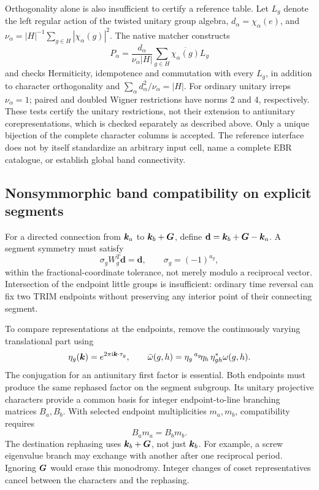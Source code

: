 Orthogonality alone is also insufficient to certify a reference
table. Let $L_g$ denote the left regular action of the twisted
unitary group algebra, $d_\alpha=\chi_\alpha(e)$, and
$\nu_\alpha=|H|^{-1}\sum_{g\in H}|\chi_\alpha(g)|^2$.
The native matcher constructs
\begin{equation}
 P_\alpha=\frac{d_\alpha}{\nu_\alpha|H|}
               \sum_{g\in H}\overline{\chi_\alpha(g)}L_g
 \label{eq:character-central-projector}
\end{equation}
and checks Hermiticity, idempotence and commutation with every $L_g$,
in addition to character orthogonality and
$\sum_\alpha d_\alpha^2/\nu_\alpha=|H|$.
For ordinary unitary irreps $\nu_\alpha=1$; paired and doubled Wigner
restrictions have norms 2 and 4, respectively. These tests certify
the unitary restrictions, not their extension to antiunitary
corepresentations, which is checked separately as described above.
Only a unique bijection of the complete character columns is accepted.
The reference interface does not by itself standardize an arbitrary
input cell, name a complete EBR catalogue, or establish global band
connectivity.

\subsection{Nonsymmorphic band compatibility on explicit segments}
For a directed connection from $\bm{k}_a$ to $\bm{k}_b+\bm{G}$, define
$\mathbf d=\bm{k}_b+\bm{G}-\bm{k}_a$. A segment symmetry must satisfy
\begin{equation}
 \sigma_g W_g^T\mathbf d=\mathbf d,\qquad
 \sigma_g=(-1)^{a_g},
 \label{eq:line-stabilizer}
\end{equation}
within the fractional-coordinate tolerance, not merely modulo a
reciprocal vector. Intersection of the endpoint little groups is
insufficient: ordinary time reversal can fix two TRIM endpoints
without preserving any interior point of their connecting segment.

To compare representations at the endpoints, remove the continuously
varying translational part using
\begin{equation}
 \eta_g(\bm{k})=e^{2\pi\mathrm{i}\bm{k}\cdot\tau_g},\qquad
 \bar\omega(g,h)=\eta_g\,{}^{a_g}\!\eta_h\,
                         \eta_{gh}^*\omega(g,h).
 \label{eq:line-rephasing}
\end{equation}
The conjugation for an antiunitary first factor is essential.
Both endpoints must produce the same rephased factor on the segment
subgroup. Its unitary projective characters provide a common basis
for integer endpoint-to-line branching matrices $B_a,B_b$.
With selected endpoint multiplicities $m_a,m_b$, compatibility requires
\begin{equation}
 B_a m_a=B_b m_b .
 \label{eq:line-compatibility}
\end{equation}
The destination rephasing uses $\bm{k}_b+\bm{G}$, not just $\bm{k}_b$.
For example, a screw eigenvalue branch may exchange with another after
one reciprocal period. Ignoring $\bm{G}$ would erase this monodromy.
Integer changes of coset representatives cancel between the
characters and the rephasing.

